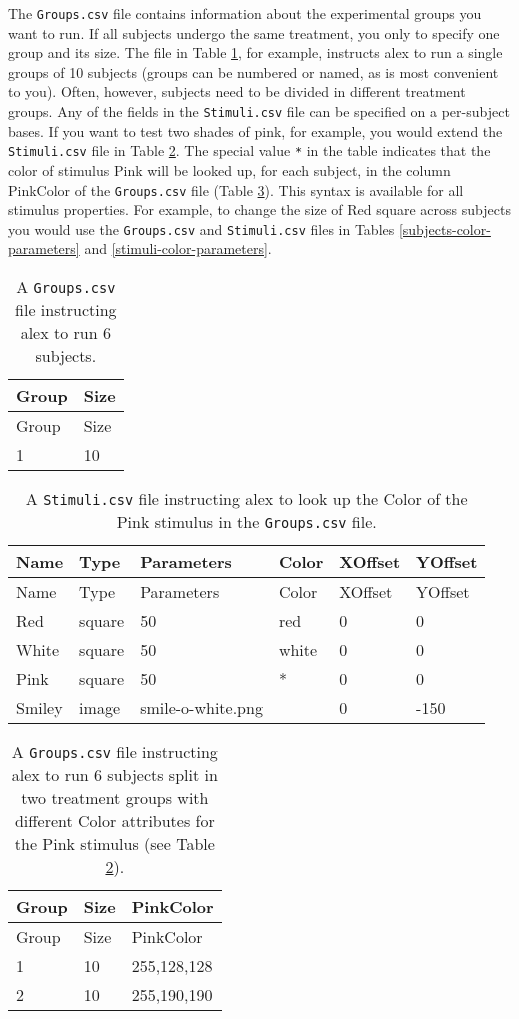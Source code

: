 \documentclass[11pt,]{article}
\begin{document}
The \texttt{Groups.csv} file contains information about the experimental
groups you want to run. If all subjects undergo the same treatment, you
only to specify one group and its size. The file in Table
\ref{subjects}, for example, instructs alex to run a single groups of 10
subjects (groups can be numbered or named, as is most convenient to
you). Often, however, subjects need to be divided in different treatment
groups. Any of the fields in the \texttt{Stimuli.csv} file can be
specified on a per-subject bases. If you want to test two shades of
pink, for example, you would extend the \texttt{Stimuli.csv} file in
Table \ref{stimuli-color}. The special value \texttt{*} in the table
indicates that the color of stimulus Pink will be looked up, for each
subject, in the column PinkColor of the \texttt{Groups.csv} file (Table
\ref{subjects-color}). This syntax is available for all stimulus
properties. For example, to change the size of Red square across
subjects you would use the \texttt{Groups.csv} and \texttt{Stimuli.csv}
files in Tables \ref{subjects-color-parameters} and
\ref{stimuli-color-parameters}.

\begin{longtable}[c]{@{}ll@{}}
\caption{A \texttt{Groups.csv} file instructing alex to run 6 subjects.
\label{subjects}}\tabularnewline
\toprule
Group & Size\tabularnewline
\midrule
\endfirsthead
\toprule
Group & Size\tabularnewline
\midrule
\endhead
1 & 10\tabularnewline
\bottomrule
\end{longtable}

\begin{longtable}[c]{@{}llllll@{}}
\caption{A \texttt{Stimuli.csv} file instructing alex to look up the
Color of the Pink stimulus in the \texttt{Groups.csv} file.
\label{stimuli-color}}\tabularnewline
\toprule
Name & Type & Parameters & Color & XOffset & YOffset\tabularnewline
\midrule
\endfirsthead
\toprule
Name & Type & Parameters & Color & XOffset & YOffset\tabularnewline
\midrule
\endhead
Red & square & 50 & red & 0 & 0\tabularnewline
White & square & 50 & white & 0 & 0\tabularnewline
Pink & square & 50 & * & 0 & 0\tabularnewline
Smiley & image & smile-o-white.png & & 0 & -150\tabularnewline
\bottomrule
\end{longtable}

\begin{longtable}[c]{@{}lll@{}}
\caption{A \texttt{Groups.csv} file instructing alex to run 6 subjects
split in two treatment groups with different Color attributes for the
Pink stimulus (see Table \ref{stimuli-color}).
\label{subjects-color}}\tabularnewline
\toprule
Group & Size & PinkColor\tabularnewline
\midrule
\endfirsthead
\toprule
Group & Size & PinkColor\tabularnewline
\midrule
\endhead
1 & 10 & 255,128,128\tabularnewline
2 & 10 & 255,190,190\tabularnewline
\bottomrule
\end{longtable}
\end{document}
